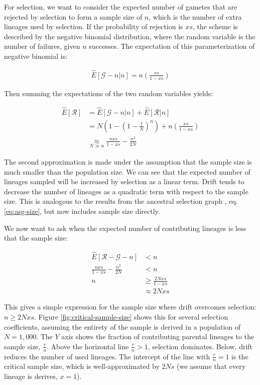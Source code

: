 \documentclass[review]{elsarticle}
\begin{document}
For selection, we want to consider the expected number of gametes that are rejected by selection to
form a sample size of $n$, which is the number of extra lineages used by selection. If the
probability of rejection is $xs$, the scheme is described by the negative binomial distribution,
where the random variable is the number of failures, given $n$ successes. The expectation of this
parameterization of negative binomial is:

\begin{align}
  \label{eq:neg-binom-fail}
  \hat{E}[\mathcal{G}-n|n] = n\left( \frac{xs}{1-xs}\right)
\end{align}

Then summing the expectations of the two random variables yields:

\begin{align}
  \hat{E}[\mathcal{R}] &= \hat{E}[\mathcal{G}-n|n] + \hat{E}[\mathcal{R}|n] \\
  &= N(1-\left( 1 - \frac{1}{N} \right)^n) + n\left( \frac{xs}{1-xs}\right) \\
  &\underset{N\gg n}{\approx} \frac{nxs}{1-xs} - \frac{n^2}{2N}
\end{align}

The second approximation is made under the assumption that the sample size is much smaller than the
population size. We can see that the expected number of lineages sampled will be increased by
selection as a linear term. Drift tends to decrease the number of lineages as a quadratic term with
respect to the sample size. This is analogous to the results from the ancestral selection graph
\citep{KroneNeuhauser1997}, eq. \eqref{eq:asg-size}, but now includes sample size directly.

We now want to ask when the expected number of contributing lineages is less that the sample size:

\begin{align}
  \label{eq:critical-sample}
  \hat{E}[\mathcal{R}-\mathcal{G}-n] &< n \nonumber \\
  \frac{nxs}{1-xs} - \frac{n^2}{2N} &< n \\
  n &\ge \frac{2Nxs}{1-xs} \nonumber \\
  &\approx 2Nxs
\end{align}

This gives a simple expression for the sample size where drift overcomes selection: $n \ge 2Nxs$.
Figure \ref{fig:critical-sample-size} shows this for several selection coefficients, assuming the
entirety of the sample is derived in a population of $N=1,000$. The $Y$ axis shows the fraction of
contributing parental lineages to the sample size, $\frac{r}{n}$. Above the horizontal line
$\frac{r}{n} > 1$, selection dominates. Below, drift reduces the number of used lineages. The
intercept of the line with $\frac{r}{n} = 1$ is the critical sample size, which is well-approximated
by $2Ns$ (we assume that every lineage is derives, $x=1$).
\end{document}
